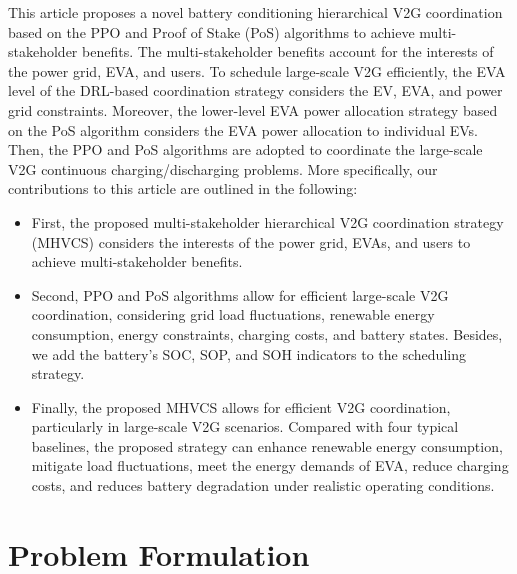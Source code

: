 \documentclass[journal,twoside]{IEEEtran}
\begin{document}
This article proposes a novel battery conditioning hierarchical V2G coordination based on the PPO and Proof of Stake (PoS) algorithms to achieve multi-stakeholder benefits. The multi-stakeholder benefits account for the interests of the power grid, EVA, and users. To schedule large-scale V2G efficiently, the EVA level of the DRL-based coordination strategy considers the EV, EVA, and power grid constraints. Moreover, the lower-level EVA power allocation strategy based on the PoS algorithm considers the EVA power allocation to individual EVs. Then, the PPO and PoS algorithms are adopted to coordinate the large-scale V2G continuous charging/discharging problems. More specifically, our contributions to this article are outlined in the following:
\begin{itemize}
\item First, the proposed multi-stakeholder hierarchical V2G coordination strategy (MHVCS) considers the interests of the power grid, EVAs, and users to achieve multi-stakeholder benefits.
\item Second, PPO and PoS algorithms allow for efficient large-scale V2G coordination, considering grid load fluctuations, renewable energy consumption, energy constraints, charging costs, and battery states. Besides, we add the battery's SOC, SOP, and SOH indicators to the scheduling strategy.
\item Finally, the proposed MHVCS allows for efficient V2G coordination, particularly in large-scale V2G scenarios. Compared with four typical baselines, the proposed strategy can enhance renewable energy consumption, mitigate load fluctuations, meet the energy demands of EVA, reduce charging costs, and reduces battery degradation under realistic operating conditions.
\end{itemize}

\section{Problem Formulation}
\end{document}
